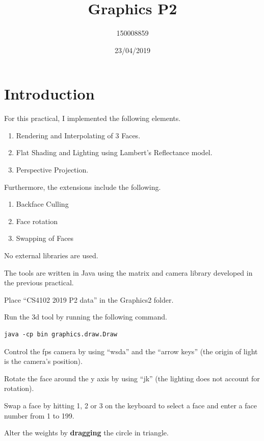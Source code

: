 \documentclass{article}
\title{Graphics P2}
\date{23/04/2019}
\author{150008859}
\begin{document}
\maketitle

\section{Introduction}

For this practical, I implemented the following elements.

\begin{enumerate}
\item Rendering and Interpolating of 3 Faces.
\item Flat Shading and Lighting using Lambert's Reflectance model.
\item Perspective Projection.
\end{enumerate}

Furthermore, the extensions include the following.

\begin{enumerate}
\item Backface Culling
\item Face rotation
\item Swapping of Faces
\end{enumerate}

No external libraries are used. 

The tools are written in Java using the matrix and camera library developed in the previous practical.

Place ``CS4102 2019 P2 data'' in the Graphics2 folder. 

Run the 3d tool by running the following command. 

\begin{verbatim}
java -cp bin graphics.draw.Draw
\end{verbatim}

Control the fps camera  by using ``wsda'' and the ``arrow keys'' (the origin of light is the camera's position).

Rotate the face around the y axis by using ``jk'' (the lighting does not account for rotation).

Swap a face by hitting 1, 2 or 3 on the keyboard to select a face and enter a face number from 1 to 199.

Alter the weights by \textbf{dragging} the circle in triangle.
\end{document}

